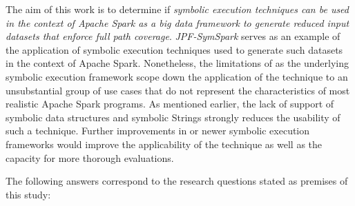 The aim of this work is to  determine if \textit{symbolic execution techniques can be used in the context of Apache Spark as a big data framework to generate reduced input datasets that enforce full path coverage}. \textit{JPF-SymSpark} serves as an example of the application of symbolic execution techniques used to generate such datasets in the context of Apache Spark. Nonetheless, the limitations of \spf{} as the underlying symbolic execution framework scope down the application of the technique to an unsubstantial group of use cases that do not represent the characteristics of most realistic Apache Spark programs. As mentioned earlier, the lack of support of symbolic data structures and symbolic Strings strongly reduces the usability of such a technique. Further improvements in \spf{} or newer symbolic execution frameworks would improve the applicability of the technique as well as the capacity for more thorough evaluations.

The following answers correspond to the research questions stated as premises of this study:

